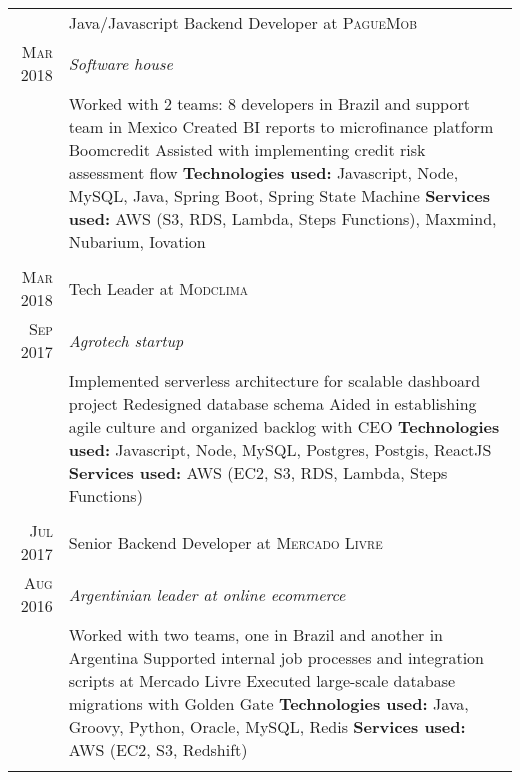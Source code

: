 \documentclass[a4paper,10pt]{article}
\begin{document}
\begin{tabular}{r|p{11cm}}
{ \textsc{ Sep 2019 } & Java/Javascript Backend Developer at \textsc{PagueMob} \\\textsc{Mar 2018}&\emph{Software house }\\&\footnotesize{
  Worked with 2 teams: 8 developers in Brazil and support team in Mexico \newline
  Created BI reports to microfinance platform Boomcredit \newline
  Assisted with implementing credit risk assessment flow \newline
\textbf{Technologies used:} Javascript, Node, MySQL, Java, Spring Boot, Spring State Machine\newline
\textbf{Services used:} AWS (S3, RDS, Lambda, Steps Functions), Maxmind, Nubarium, Iovation }\\\multicolumn{2}{c}{} \\

 \textsc{ Mar 2018 } & Tech Leader at \textsc{Modclima} \\\textsc{Sep 2017}&\emph{Agrotech startup }\\&\footnotesize{
  Implemented serverless architecture for scalable dashboard project\newline
  Redesigned database schema\newline
  Aided in establishing agile culture and organized backlog with CEO\newline
\textbf{Technologies used:} Javascript, Node, MySQL, Postgres, Postgis, ReactJS\newline
\textbf{Services used:} AWS (EC2, S3, RDS, Lambda, Steps Functions)}\\\multicolumn{2}{c}{} \\

 \textsc{Jul 2017} & Senior Backend Developer at \textsc{Mercado Livre} \\\textsc{Aug 2016}&\emph{Argentinian leader at online ecommerce }\\&\footnotesize{
  Worked with two teams, one in Brazil and another in Argentina\newline
  Supported internal job processes and integration scripts at Mercado Livre\newline
  Executed large-scale database migrations with Golden Gate\newline
\textbf{Technologies used:} Java, Groovy, Python, Oracle, MySQL, Redis\newline
\textbf{Services used:} AWS (EC2, S3, Redshift)}\\\multicolumn{2}{c}{} \\
 
 \end{tabular}
 
\end{document}
